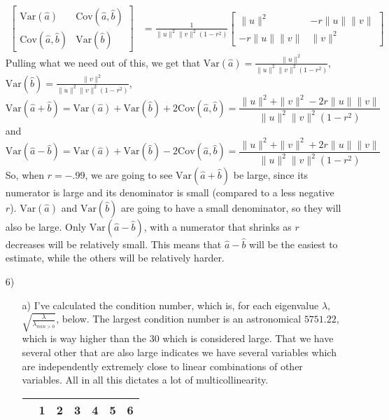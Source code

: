 \documentclass[11pt]{article}
\newcommand{\var}{\mathrm{Var}}
\newcommand{\cov}{\mathrm{Cov}}
\theoremstyle{definition}
\begin{document}
\begin{itemize}
\begin{align*}
            \left[\begin{array}{cc} \var(\hat a) & \cov(\hat a,\hat b) \\ \cov(\hat a,\hat b) & \var(\hat b) \end{array} \right] &= \frac{1}{\|u\|^2\|v\|^2(1-r^2)} \left[\begin{array}{cc} \|u\|^2 & - r\|u\|\|v\| \\ -r\|u\|\|v\| & \|v\|^2 \end{array} \right]
        \end{align*}
        Pulling what we need out of this, we get that \(\var(\hat a) = \frac{\|u\|^2}{\|u\|^2\|v\|^2(1-r^2)}\), \(\var(\hat b) = \frac{\|v\|^2}{\|u\|^2\|v\|^2(1-r^2)}\),
        \[\var(\hat a + \hat b) = \var(\hat a) + \var(\hat b) + 2\cov(\hat a,\hat b) = \frac{\|u\|^2 + \|v\|^2 - 2r\|u\|\|v\| }{\|u\|^2\|v\|^2(1-r^2)}\]
        and
        \[\var(\hat a - \hat b) = \var(\hat a) + \var(\hat b) - 2\cov(\hat a,\hat b) = \frac{\|u\|^2 + \|v\|^2 + 2r\|u\|\|v\| }{\|u\|^2\|v\|^2(1-r^2)}\]
        So, when $r=-.99$, we are going to see $\var(\hat a + \hat b)$ be large, since its numerator is large and its denominator is small (compared to a less negative $r$). $\var(\hat a)$ and $\var(\hat b)$ are going to have a small denominator, so they will also be large. Only $\var(\hat a - \hat b)$, with a numerator that shrinks as $r$ decreases will be relatively small. This means that \(\hat a - \hat b\) will be the easiest to estimate, while the others will be relatively harder.  
    \item[6)]
        \begin{itemize}
            \item[a)]
                I've calculated the condition number, which is, for each eigenvalue $\lambda$, \(\sqrt{\frac{\lambda}{\lambda_{min>0}}}\), below. The largest condition number is an astronomical $5751.22$, which is way higher than the $30$ which is considered large. That we have several other that are also large indicates we have several variables which are independently extremely close to linear combinations of other variables. All in all this dictates a lot of multicollinearity. \\
                \begin{table}[ht]
                    \centering
                    \begin{tabular}{rrrrrrr}
                          \hline
                           & 1 & 2 & 3 & 4 & 5 & 6 \\ 
                            \hline

\end{tabular}
\end{table}
\end{itemize}
\end{itemize}
\end{document}
